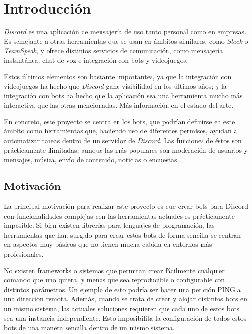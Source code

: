 \chapter{Introducción}

\textit{Discord}\cite{discord} es una aplicación de mensajería de uso tanto personal como en empresas. Es semejante a otras herramientas que se usan en ámbitos similares, como \textit{Slack}\cite{slack} o \textit{TeamSpeak}\cite{teamspeak}, y ofrece distintos servicios de comunicación, como mensajería instantánea, chat de voz e integración con bots y videojuegos.

Estos últimos elementos son bastante importantes, ya que la integración con videojuegos ha hecho que \textit{Discord} gane visibilidad en los últimos años; y la integración con bots ha hecho que la aplicación sea una herramienta mucho más interactiva que las otras mencionadas. Más información en el estado del arte.

En concreto, este proyecto se centra en los bots, que podrían definirse en este ámbito como herramientas que, haciendo uso de diferentes permisos, ayudan a automatizar tareas dentro de un servidor de \textit{Discord}. Las funciones de éstos son prácticamente ilimitadas, aunque las más populares son moderación de usuarios y mensajes, música, envío de contenido, noticias o encuestas.

\section{Motivación}

La principal motivación para realizar este proyecto es que crear bots para Discord con funcionalidades complejas con las herramientas actuales es prácticamente imposible. Si bien existen librerías para lenguajes de programación, las herramientas que han surgido para crear estos bots de forma sencilla se centran en aspectos muy básicos que no tienen mucha cabida en entornos más profesionales.

No existen frameworks o sistemas que permitan crear fácilmente cualquier comando que uno quiera, y menos que sea reproducible o configurable con distintos parámetros. Un ejemplo de esto podría ser hacer una petición PING a una dirección remota. Además, cuando se trata de crear y alojar distintos bots en un mismo sistema, las actuales soluciones requieren que cada uno de estos bots sea una instancia independiente. Esto imposibilita la configuración de todos estos bots de una manera sencilla dentro de un mismo sistema.

